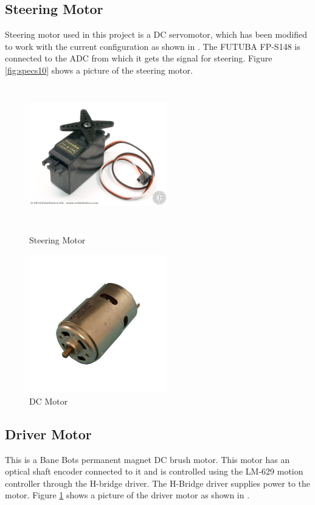 \subsection{Steering Motor}
Steering motor used in this project is a DC servomotor, which has been modified to work with the current configuration as shown in \cite{woodley1999testbed}. The FUTUBA FP-S148 is connected to the ADC from which it gets the signal for steering. Figure \ref{fig:specs10} shows a picture of the steering motor.

\begin{figure}[ht]
\begin{minipage}[b]{0.45\linewidth}
    \centering
    \includegraphics[width=6cm,height=6cm,keepaspectratio]{Pictures/FP.jpg}
    \caption{Steering Motor}
    \label{fig:specs10}
\end{minipage}
\begin{minipage}[b]{0.45\linewidth}
    \centering
    \includegraphics[width=6cm,height=6cm,keepaspectratio]{Pictures/DCMotor.jpg}
    \caption{DC Motor}
    \label{fig:specs11}
\end{minipage}
\end{figure}
\subsection{Driver Motor}
This is a Bane Bots permanent magnet DC brush motor. This motor has an optical shaft encoder connected to it and is controlled using the LM-629 motion controller through the H-bridge driver. The H-Bridge driver supplies power to the motor. Figure \ref{fig:specs11} shows a picture of the driver motor as shown in \cite{dhake2007real,woodley1999testbed}.

